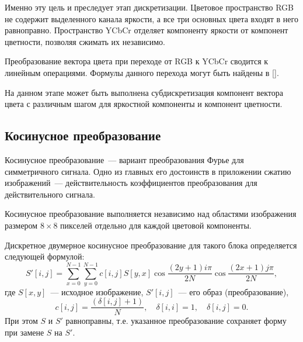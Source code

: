 \documentclass[12pt,a4paper]{article}
\begin{document}
            Именно эту цель и преследует этап дискретизации. Цветовое пространство RGB не содержит выделенного канала яркости, а все три основных цвета входят в него равноправно. Пространство YCbCr отделяет компоненту яркости от компонент цветности, позволяя сжимать их независимо.

            Преобразование вектора цвета при переходе от RGB к YCbCr сводится к линейным операциями. Формулы данного перехода могут быть найдены в [\cite{miano_jpeg}].

            На данном этапе может быть выполнена субдискретизация компонент вектора цвета с различным шагом для яркостной компоненты и компонент цветности.


        \subsection{Косинусное преобразование}

            Косинусное преобразование~--- вариант преобразования Фурье для симметричного сигнала. Одно из главных его достоинств в приложении сжатию изображений~--- действительность коэффициентов преобразования для действительного сигнала.

            Косинусное преобразование выполняется независимо над областями изображения размером $8\times 8$ пикселей отдельно для каждой цветовой компоненты.

            Дискретное двумерное косинусное преобразование для такого блока определяется следующей формулой:
            \begin{equation*}
                S'[i,j]=\sum\limits_{x=0}^{N-1}\sum\limits_{y=0}^{N-1}c[i,j]S[y,x]\cos{\frac{(2y+1)i\pi}{2N}}\cos{\frac{(2x+1)j\pi}{2N}},
            \end{equation*}
            где $S[x,y]$~--- исходное изображение, $S'[i,j]$~--- его образ (преобразование),
            \begin{equation*}
                c[i,j]=\frac{(\delta[i,j]+1)}{N}, \quad \delta[i,i] = 1, \quad \delta[i,j] = 0 .
            \end{equation*}
            При этом $S$ и $S'$ равноправны, т.е. указанное преобразование сохраняет форму при замене $S$ на $S'$.
\end{document}
